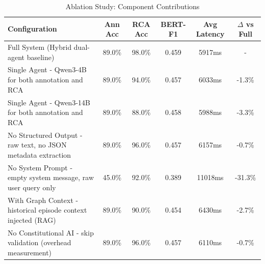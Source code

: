 \begin{table}[h]
\centering
\caption{Ablation Study: Component Contributions}
\label{tab:ablation}
\begin{tabular}{lccccc}
\toprule
\textbf{Configuration} & \textbf{Ann Acc} & \textbf{RCA Acc} & \textbf{BERT-F1} & \textbf{Avg Latency} & \textbf{$\Delta$ vs Full} \\
\midrule
Full System (Hybrid dual-agent baseline) & 89.0\% & 98.0\% & 0.459 & 5917ms & - \\
Single Agent - Qwen3-4B for both annotation and RCA & 89.0\% & 94.0\% & 0.457 & 6033ms & -1.3\% \\
Single Agent - Qwen3-14B for both annotation and RCA & 89.0\% & 88.0\% & 0.458 & 5988ms & -3.3\% \\
No Structured Output - raw text, no JSON metadata extraction & 89.0\% & 96.0\% & 0.457 & 6157ms & -0.7\% \\
No System Prompt - empty system message, raw user query only & 45.0\% & 92.0\% & 0.389 & 11018ms & -31.3\% \\
With Graph Context - historical episode context injected (RAG) & 89.0\% & 90.0\% & 0.454 & 6430ms & -2.7\% \\
No Constitutional AI - skip validation (overhead measurement) & 89.0\% & 96.0\% & 0.457 & 6110ms & -0.7\% \\
\bottomrule
\end{tabular}
\end{table}
